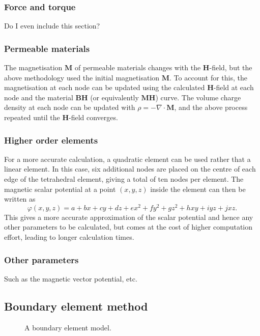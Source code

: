 \subsubsection*{Force and torque}
Do I even include this section?

\subsubsection*{Permeable materials}
The magnetisation \(\mathbf{M}\) of permeable materials changes with the \(\mathbf{H}\)-field, but the above methodology used the initial magnetisation \(\mathbf{M}\). To account for this, the magnetisation at each node can be updated using the calculated \(\mathbf{H}\)-field at each node and the material \(\mathbf{BH}\) (or equivalently \(\mathbf{MH}\)) curve. The volume charge density at each node can be updated with \(\rho = -\nabla \cdot \mathbf{M}\), and the above process repeated until the \(\mathbf{H}\)-field converges.

\subsubsection*{Higher order elements}
For a more accurate calculation, a quadratic element can be used rather that a linear element. In this case, six additional nodes are placed on the centre of each edge of the tetrahedral element, giving a total of ten nodes per element. The magnetic scalar potential at a point \(\left(x,y,z\right)\) inside the element can then be written as
\begin{equation}
    \varphi\left(x,y,z\right) = a + bx + cy + dz + ex^2 + fy^2 + gz^2 + hxy + iyz + jxz \text{.}
\end{equation}
This gives a more accurate approximation of the scalar potential and hence any other parameters to be calculated, but comes at the cost of higher computation effort, leading to longer calculation times.

\subsubsection*{Other parameters}
Such as the magnetic vector potential, etc.

\subsection{Boundary element method}

\begin{figure}
    \centering
    \vspace{5cm}
    \caption{A boundary element model.}
    \label{fig:BEMschematic}
\end{figure}

